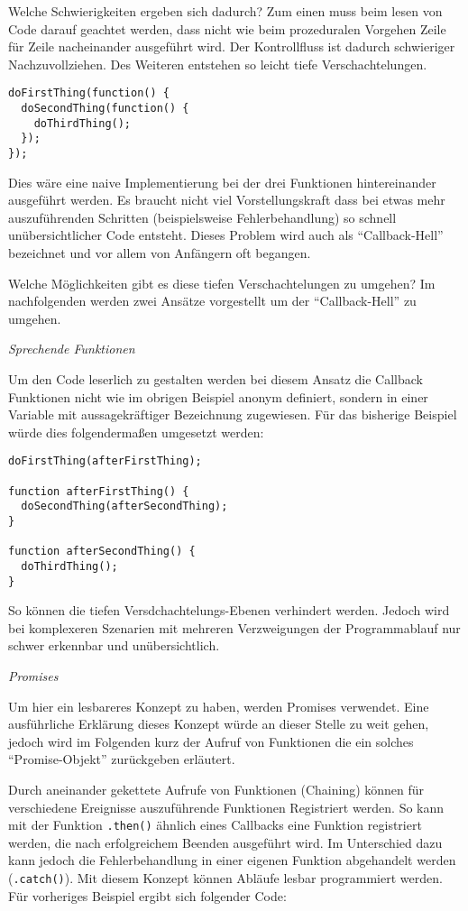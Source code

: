 Welche Schwierigkeiten ergeben sich dadurch? Zum einen muss beim lesen
von Code darauf geachtet werden, dass nicht wie beim prozeduralen
Vorgehen Zeile für Zeile nacheinander ausgeführt wird. Der Kontrollfluss
ist dadurch schwieriger Nachzuvollziehen. Des Weiteren entstehen so
leicht tiefe Verschachtelungen.

\begin{verbatim}
doFirstThing(function() {
  doSecondThing(function() {
    doThirdThing();
  });
}); 
\end{verbatim}

Dies wäre eine naive Implementierung bei der drei Funktionen
hintereinander ausgeführt werden. Es braucht nicht viel
Vorstellungskraft dass bei etwas mehr auszuführenden Schritten
(beispielsweise Fehlerbehandlung) so schnell unübersichtlicher Code
entsteht. Dieses Problem wird auch als ``Callback-Hell'' bezeichnet und
vor allem von Anfängern oft begangen.

Welche Möglichkeiten gibt es diese tiefen Verschachtelungen zu umgehen?
Im nachfolgenden werden zwei Ansätze vorgestellt um der
``Callback-Hell'' zu umgehen.

\emph{Sprechende Funktionen}

Um den Code leserlich zu gestalten werden bei diesem Ansatz die Callback
Funktionen nicht wie im obrigen Beispiel anonym definiert, sondern in
einer Variable mit aussagekräftiger Bezeichnung zugewiesen. Für das
bisherige Beispiel würde dies folgendermaßen umgesetzt werden:

\begin{verbatim}
doFirstThing(afterFirstThing);

function afterFirstThing() {
  doSecondThing(afterSecondThing);
}

function afterSecondThing() {
  doThirdThing();
}
\end{verbatim}

So können die tiefen Versdchachtelungs-Ebenen verhindert werden. Jedoch
wird bei komplexeren Szenarien mit mehreren Verzweigungen der
Programmablauf nur schwer erkennbar und unübersichtlich.

\emph{Promises}

Um hier ein lesbareres Konzept zu haben, werden Promises verwendet. Eine
ausführliche Erklärung dieses Konzept würde an dieser Stelle zu weit
gehen, jedoch wird im Folgenden kurz der Aufruf von Funktionen die ein
solches ``Promise-Objekt'' zurückgeben erläutert.

Durch aneinander gekettete Aufrufe von Funktionen (Chaining) können für
verschiedene Ereignisse auszuführende Funktionen Registriert werden. So
kann mit der Funktion \texttt{.then()} ähnlich eines Callbacks eine
Funktion registriert werden, die nach erfolgreichem Beenden ausgeführt
wird. Im Unterschied dazu kann jedoch die Fehlerbehandlung in einer
eigenen Funktion abgehandelt werden (\texttt{.catch()}). Mit diesem
Konzept können Abläufe lesbar programmiert werden. Für vorheriges
Beispiel ergibt sich folgender Code:

